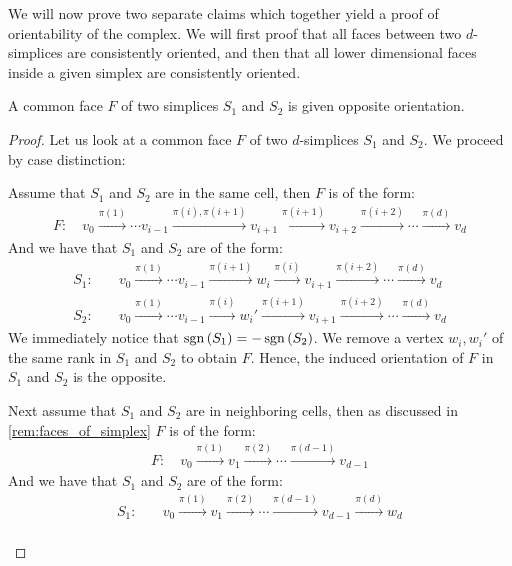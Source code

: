We will now prove two separate claims which together yield a proof of orientability of the complex. We will first proof that all faces between two $d$-simplices are consistently oriented, and then that all lower dimensional faces inside a given simplex are consistently oriented.

\begin{claim}
    A common face $F$ of two simplices $S_1$ and $S_2$ is given opposite orientation.
\end{claim}

\begin{proof}
	Let us look at a common face $F$ of two $d$-simplices $S_1$ and $S_2$. We proceed by case distinction:
	\begin{case}{1}
		Assume that $S_1$ and $S_2$ are in the same cell, then $F$ is of the form:
		\begin{align*}
			F: \quad v_0 \xrightarrow{\pi(1)}  \cdots v_{i-1} \xrightarrow{\pi(i), \pi(i+1)} v_{i+1} \xrightarrow{\pi(i+1)} v_{i+2} \xrightarrow{\pi(i+2)} \cdots \xrightarrow{\pi(d)} v_d
		\end{align*}
		And we have that $S_1$ and $S_2$ are of the form:
		\begin{align*}
			S_1: \quad & v_0 \xrightarrow{\pi(1)} \cdots v_{i-1} \xrightarrow{\pi(i+1)} w_i \xrightarrow{\pi(i)} v_{i+1} \xrightarrow{\pi(i+2)} \cdots \xrightarrow{\pi(d)} v_d  \\
			S_2: \quad & v_0 \xrightarrow{\pi(1)} \cdots v_{i-1} \xrightarrow{\pi(i)} w_i' \xrightarrow{\pi(i+1)} v_{i+1} \xrightarrow{\pi(i+2)} \cdots \xrightarrow{\pi(d)} v_d
		\end{align*}
		We immediately notice that $\operatorname{sgn}\left(S_1\right) = - \operatorname{sgn}\left(S_2\right)$. We remove a vertex $w_i, w_i'$ of the same rank in $S_1$ and $S_2$ to obtain $F$. Hence, the induced orientation of $F$ in $S_1$ and $S_2$ is the opposite.
	\end{case}
	\begin{case}{2}
		Next assume that $S_1$ and $S_2$ are in neighboring cells, then as discussed in \cref{rem:faces_of_simplex} $F$ is of the form:
		\begin{align*}
			F: \quad v_0 \xrightarrow{\pi(1)} v_1 \xrightarrow{\pi(2)} \cdots \xrightarrow{\pi(d-1)} v_{d-1}
		\end{align*}
		And we have that $S_1$ and $S_2$ are of the form:
		\begin{align*}
			S_1: & \quad v_0 \xrightarrow{\pi(1)} v_1 \xrightarrow{\pi(2)} \cdots \xrightarrow{\pi(d-1)} v_{d-1} \xrightarrow{\pi(d)} w_d \\

\end{align*}
\end{case}
\end{proof}
